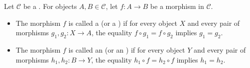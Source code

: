 \begin{definition} \label{definition:monomorphism_and_epimorphism_in_categories}
Let $\mathcal{C}$ be a . For objects $A, B \in \mathcal{C}$, let $f: A \to B$ be a morphism in $\mathcal{C}$.  
\begin{itemize}
    \item The morphism $f$ is called a  (or a ) if for every object $X$ and every pair of morphisms $g_1, g_2 : X \to A$, the equality $f \circ g_1 = f \circ g_2$ implies $g_1 = g_2$.  
    \item The morphism $f$ is called an  (or an ) if for every object $Y$ and every pair of morphisms $h_1, h_2: B \to Y$, the equality $h_1 \circ f = h_2 \circ f$ implies $h_1 = h_2$.  
\end{itemize}
\end{definition}
